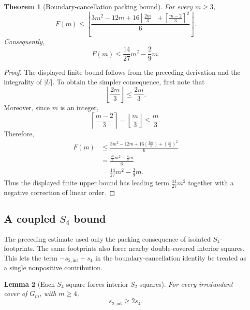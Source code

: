 \documentclass[11pt]{article}
\newtheorem{theorem}{Theorem}[section]
\newtheorem{lemma}[theorem]{Lemma}
\begin{document}
	\begin{theorem}[Boundary-cancellation packing bound]
		For every \(m\ge3\),
		\[
		{
			F(m)
			\le
			\left\lfloor
			\frac{
				3m^2-12m
				+
				16\left\lfloor\frac{2m}{3}\right\rfloor
				+
				\left\lceil\frac{m-2}{3}\right\rceil^2
			}{6}
			\right\rfloor.
		}
		\]
		Consequently,
		\[
		{
			F(m)\le \frac{14}{27}m^2-\frac{2}{9}m.
		}
		\]
		
	\end{theorem}
	
	\begin{proof}
		The displayed finite bound follows from the preceding derivation and the
		integrality of \(|U|\). To obtain the simpler consequence, first note that
		\[
		\left\lfloor\frac{2m}{3}\right\rfloor
		\le
		\frac{2m}{3}.
		\]
		Moreover, since \(m\) is an integer,
		\[
		\left\lceil\frac{m-2}{3}\right\rceil
		=
		\left\lfloor\frac{m}{3}\right\rfloor
		\le
		\frac{m}{3}.
		\]
		Therefore,
		\[
		\begin{aligned}
			F(m)
			&\le
			\frac{
				3m^2-12m
				+
				16\left(\frac{2m}{3}\right)
				+
				\left(\frac{m}{3}\right)^2
			}{6}
			\\
			&=
			\frac{
				\frac{28}{9}m^2-\frac{4}{3}m
			}{6}
			\\
			&=
			\frac{14}{27}m^2-\frac{2}{9}m.
		\end{aligned}
		\]
		Thus the displayed finite upper bound has leading term
		\(\frac{14}{27}m^2\) together with a negative correction of linear order.
	\end{proof}
	
	
	\subsection{A coupled \(S_4\) bound}
	
	The preceding estimate used only the packing consequence of isolated
	\(S_4\)-footprints.  The same footprints also force nearby double-covered
	interior squares.  This lets the term
	\(-s_{2,\mathrm{int}}+s_4\) in the boundary-cancellation identity be treated as
	a single nonpositive contribution.
	
	\begin{lemma}[Each \(S_4\)-square forces interior \(S_2\)-squares]
		For every irredundant cover of \(G_m\), with \(m\ge4\),
		\[
		{s_{2,\mathrm{int}}\ge 2s_4.}
		\]
	\end{lemma}
	
\end{document}
